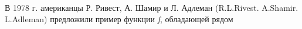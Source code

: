 \begin{comment}
\paragraph{} Труды Евклида и Диофанта, Ферма и Эйлера, Гаусса, Чебышева и Эрмита содержат остроумные и весьма эффективные алгоритмы решения диофантовых 
уравнений, выяснения разрешимости сравнений, построения больших по тем временам простых чисел, нахождения наилучших приближений и т.д. В последние два 
десятилетия, благодаря в первую очередь запросам криптографии и широкому распространению ЭВМ, исследования по алгоритмическим вопросам теории чисел 
переживают период бурного и весьма плодотворного развития. Вычислительные машины и электронные средства связи проникли практически во все сферы 
человеческой деятельности. Немыслима без них и современная криптография. Шифрование и дешифрование текстов можно представлять себе как процессы 
переработки целых чисел при помощи ЭВМ, а способы, которыми выполняются эти операции, как некоторые функции, определённые на множестве целых чисел. 
Всё это делает естественным появление в криптографии методов теории чисел. Кроме того, стойкость ряда современных криптосистем обосновывается только 
сложностью некоторых теоретико-числовых задач. Но возможности ЭВМ имеют определённые границы. Приходится разбивать длинную цифровую последовательность 
на блоки ограниченной длины и шифровать каждый такой блок отдельно. Мы будем считать в дальнейшем, что все шифруемые целые числа неотрицательны и по 
величине меньше некоторого заданного (скажем, техническими ограничениями) числа \textit{m}. Таким же условиям будут удовлетворять и числа, получаемые 
в процессе шифрования. Это позволяет считать и те, и другие числа элементами кольца вычетов. Шифрующая функция при этом может рассматриваться как 
взаимнооднозначное отображение колец вычетов а число  представляет собой сообщение  в зашифрованном виде.

  Простейший шифр такого рода - шифр замены, соответствует отображению
\begin{equation}
    \textit{f : x {$\rightarrow$} x + k (mod m)}
\end{equation}
при некотором фиксированном целом \textit{k}. Подобный шифр использовал еще Юлий Цезарь. Конечно, не каждое отображение  подходит для целей надежного 
сокрытия информации.
\end{comment}
  В 1978 г. американцы Р. Ривест, А. Шамир и Л. Адлеман (R.L.Rivest. A.Shamir. L.Adleman) предложили пример функции \textit{f}, обладающей рядом 
